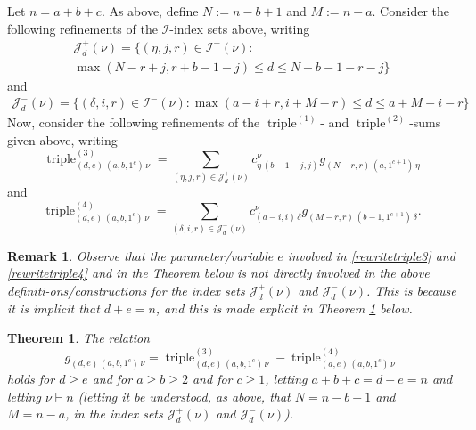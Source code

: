 \documentclass[12pt]{article}
\newtheorem{theorem}{Theorem}
\newtheorem{remark}{Remark}
\begin{document}
 Let $n = a + b + c$. As above, define $N:= n - b + 1$ and $M := n - a$. Consider the following refinements of the $\mathcal{I}$-index 
 sets above, writing 
\begin{multline*}
 \mathcal{J}^{+}_{d}(\nu) = \big\{ (\eta, j, r) \in \mathcal{I}^{+}(\nu) : \\ 
 \max(N - r + j, r + b - 1 - j) \leq d \leq N +b - 1 - r - j \big\}
\end{multline*}
 and 
\begin{multline*}
 \mathcal{J}^{-}_{d}(\nu) = \big\{ (\delta, i, r) \in \mathcal{I}^{-}(\nu) : \max(a-i+r, i+M-r) \leq d \leq a + M - i - r \big\}
\end{multline*}
 Now, consider the following refinements of the $\operatorname{triple}^{(1)}$- and $\operatorname{triple}^{(2)}$-sums given 
 above, writing 
\begin{equation}\label{rewritetriple3} 
 \operatorname{triple}^{(3)}_{(d, e) \, (a, b, 1^{c}) \, \nu } = \sum_{ (\eta, j, r) \in \mathcal{J}^{+}_{d}(\nu) } c_{\eta \, (b - 
 1 - j, j)}^{\nu} g_{(N - r, r) \, (a, 1^{c+1}) \, \eta } 
\end{equation}
 and 
\begin{equation}\label{rewritetriple4}
 \operatorname{triple}^{(4)}_{(d, e) \, (a, b, 1^{c}) \, \nu} = \sum_{(\delta, i, r) \in \mathcal{J}^{-}_{d}(\nu) } c_{(a - i, i) \, 
 \delta }^{\nu} g_{(M - r, r) \, (b - 1, 1^{c + 1}) \, \delta}. 
\end{equation}

\begin{remark}
 Observe that the parameter/variable $e$ involved in \eqref{rewritetriple3} and \eqref{rewritetriple4} and in the Theorem below is not 
 \emph{directly} involved in the above definiti-ons/constructions for the index sets 
 $\mathcal{J}^{+}_{d}(\nu)$ and $ \mathcal{J}^{-}_{d}(\nu)$. This is because it is \emph{implicit} that $d+e=n$, and this is made explicit 
 in Theorem \ref{triple3minus4} below. 
\end{remark}

\begin{theorem}\label{triple3minus4}
 The relation $$ g_{(d, e) \, (a, b, 1^c) \, \nu} = \operatorname{triple}^{(3)}_{(d, e) \, (a, b, 1^c) \, \nu} - \operatorname{triple}^{(4)}_{(d, e)
 \, (a, b, 1^c) \, \nu} $$ holds for $d \geq e$ and for $a \geq b \geq 2$ and for $c \geq 1$, letting $a + b + c = d + e =n$ and letting 
 $\nu \vdash n$ (letting it be understood, as above, that $N = n - b + 1$ and $M = n - a$, in the index sets $\mathcal{J}_{d}^{+}(\nu)$ 
 and $\mathcal{J}_{d}^{-}(\nu)$). 
\end{theorem}
\end{document}

